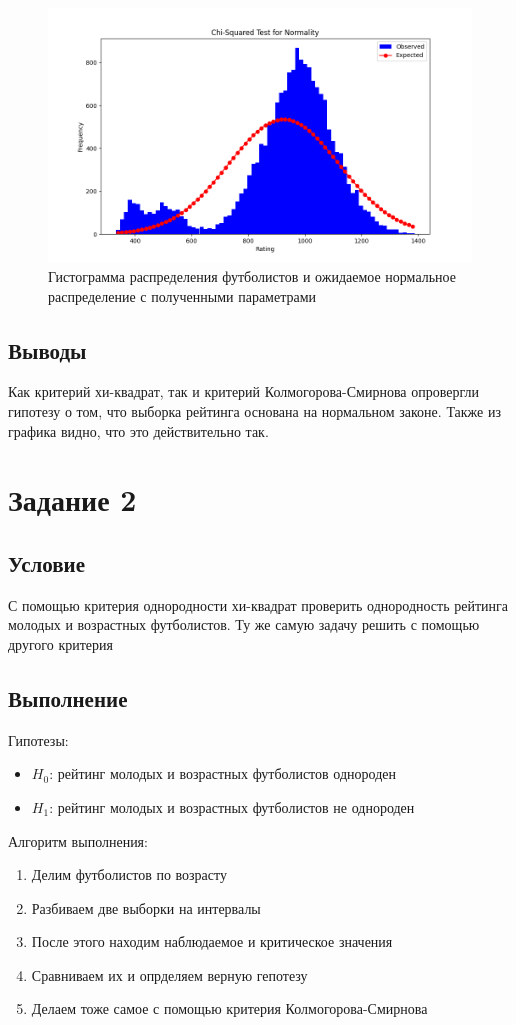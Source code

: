 \documentclass{article}
\begin{document}
\begin{figure}[H]
      \centering
      \includegraphics[width=1\linewidth]{../python/task1.png}
      \caption{Гистограмма распределения футболистов и ожидаемое нормальное распределение с полученными параметрами}\label{fig:figure1}
\end{figure}
\subsection{Выводы}
Как критерий хи-квадрат, так и критерий Колмогорова-Смирнова опровергли гипотезу о том, что выборка рейтинга основана на нормальном законе. Также из графика видно, что это действительно так.

\section{Задание 2}
\subsection{Условие}
С помощью критерия однородности хи-квадрат проверить однородность рейтинга молодых и возрастных футболистов. Ту же самую задачу решить с помощью другого критерия
\subsection{Выполнение}
Гипотезы:
\begin{itemize}
      \item $H_0$: рейтинг молодых и возрастных футболистов однороден
      \item $H_1$: рейтинг молодых и возрастных футболистов не однороден 
\end{itemize}
Алгоритм выполнения:
\begin{enumerate}
      \item Делим футболистов по возрасту
      \item Разбиваем две выборки на интервалы
      \item После этого находим наблюдаемое и критическое значения
      \item Сравниваем их и опрделяем верную гепотезу
      \item Делаем тоже самое с помощью критерия Колмогорова-Смирнова
\end{enumerate}
\end{document}

